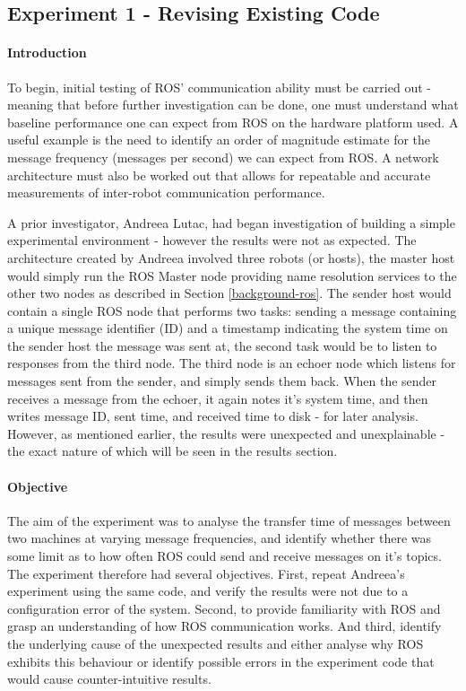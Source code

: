\documentclass[../dissertation.tex]{subfiles}
\begin{document}
\subsection{Experiment 1 - Revising Existing Code}
\label{exp-1}

\paragraph{Introduction} To begin, initial testing of ROS' communication ability must be carried out - meaning that before further investigation can be done, one must understand what baseline performance one can expect from ROS on the hardware platform used. A useful example is the need to identify an order of magnitude estimate for the message frequency (messages per second) we can expect from ROS. A network architecture must also be worked out that allows for repeatable and accurate measurements of inter-robot communication performance.

A prior investigator, Andreea Lutac\cite{andreeaLutacBlog}, had began investigation of building a simple experimental environment - however the results were not as expected. The architecture created by Andreea involved three robots (or hosts), the master host would simply run the ROS Master node providing name resolution services to the other two nodes as described in Section \ref{background-ros}. The sender host would contain a single ROS node that performs two tasks: sending a message containing a unique message identifier (ID) and a timestamp indicating the system time on the sender host the message was sent at, the second task would be to listen to responses from the third node. The third node is an echoer node which listens for messages sent from the sender, and simply sends them back. When the sender receives a message from the echoer, it again notes it's system time, and then writes message ID, sent time, and received time to disk - for later analysis. However, as mentioned earlier, the results were unexpected and unexplainable - the exact nature of which will be seen in the results section.

\paragraph{Objective} The aim of the experiment was to analyse the transfer time of messages between two machines at varying message frequencies, and identify whether there was some limit as to how often ROS could send and receive messages on it's topics. The experiment therefore had several objectives. First, repeat Andreea's experiment using the same code\cite{Experiment1InitialCode}, and verify the results were not due to a configuration error of the system. Second, to provide familiarity with ROS and grasp an understanding of how ROS communication works. And third, identify the underlying cause of the unexpected results and either analyse why ROS exhibits this behaviour or identify possible errors in the experiment code that would cause counter-intuitive results.
\end{document}
